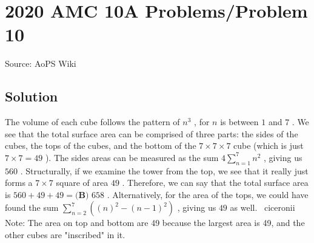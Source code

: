 \documentclass[12pt]{article}
\begin{document}
\section*{{2020 AMC 10A Problems/Problem 10}}
Source: AoPS Wiki

\subsection*{Solution}
The volume of each cube follows the pattern of $n^3$ , for $n$ is between $1$ and $7$ . We see that the total surface area can be comprised of three parts: the sides of the cubes, the tops of the cubes, and the bottom of the $7\times 7\times 7$ cube (which is just $7 \times 7 = 49$ ). The sides areas can be measured as the sum $4\sum_{n=1}^{7} n^2$ , giving us $560$ . Structurally, if we examine the tower from the top, we see that it really just forms a $7\times 7$ square of area $49$ . Therefore, we can say that the total surface area is $560 + 49 + 49 = \boxed{\textbf{(B) }658}$ .
Alternatively, for the area of the tops, we could have found the sum $\sum_{n=2}^{7}((n)^{2}-(n-1)^{2})$ , giving us $49$ as well. ~ciceronii Note: The area on top and bottom are 49 because the largest area is 49, and the other cubes are "inscribed" in it.
\end{document}
